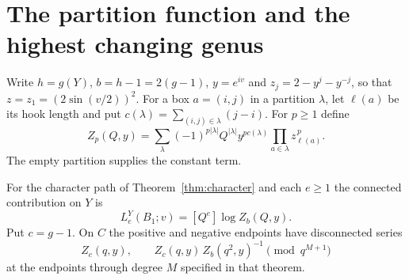 \section{The partition function and the highest changing genus}
\label{sec:partition}

Write $h=g(Y)$, $b=h-1=2(g-1)$, $y=e^{iv}$ and
$z_j=2-y^j-y^{-j}$, so that $z=z_1=(2\sin(v/2))^2$.
For a box $a=(i,j)$ in a partition $\lambda$, let $\ell(a)$ be its
hook length and put $c(\lambda)=\sum_{(i,j)\in\lambda}(j-i)$.
For $p\ge1$ define
\begin{equation}\label{eq:positiveseries}
 Z_p(Q,y)=\sum_{\lambda}(-1)^{p|\lambda|} Q^{|\lambda|}
 y^{p c(\lambda)}\prod_{a\in\lambda}z_{\ell(a)}^{\,p}.
\end{equation}
The empty partition supplies the constant term.

\begin{proposition}\label{prop:evaluation}
For the character path of Theorem~\ref{thm:character} and each $e\ge1$ the connected contribution on $Y$ is
\[
 L^Y_e(B_1;v)=[Q^e]\log Z_b(Q,y).
\]
Put $c=g-1$. On $C$ the
positive and negative endpoints have disconnected series
\[
 Z_c(q,y),\qquad Z_c(q,y)\,Z_b(q^2,y)^{-1}
 \pmod {q^{M+1}}
\]
at the endpoints through degree $M$ specified in that theorem.
\end{proposition}

